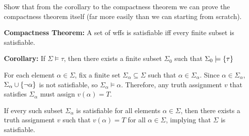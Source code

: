 \begin{problem}
  Show that from the corollary to the compactness theorem
  we can prove the compactness theorem itself
  (far more easily than we can starting from scratch).

  \begin{blockcolor}
    \textbf{Compactness Theorem:} A set of wffs is satisfiable
    iff every finite subset is satisfiable.

    \textbf{Corollary:} If $\Sigma \models \tau$, then there exists
    a finite subset $\Sigma_0$ such that $\Sigma_0 \models \left\{\tau\right\}$
  \end{blockcolor}
\end{problem}
\begin{Answer}

  \step
  For each element $\alpha \in \Sigma$, fix a finite set
  $\Sigma_\alpha \subseteq \Sigma$ such that $\alpha \in \Sigma_\alpha$.
  Since $\alpha \in \Sigma_\alpha$, $\Sigma_\alpha \cup \left\{\lnot \alpha\right\}$
  is not satisfiable, so $\Sigma_\alpha \models \alpha$.
  Therefore, any truth assignment $v$ that satisfies $\Sigma_\alpha$
  must assign $v(\alpha) = T$.

  \step
  If every such subset $\Sigma_\alpha$ is satisfiable
  for all elements $\alpha \in \Sigma$, then there exists a truth assignment
  $v$ such that $v(\alpha) = T$ for all $\alpha \in \Sigma$,
  implying that $\Sigma$ is satisfiable.

\end{Answer}

